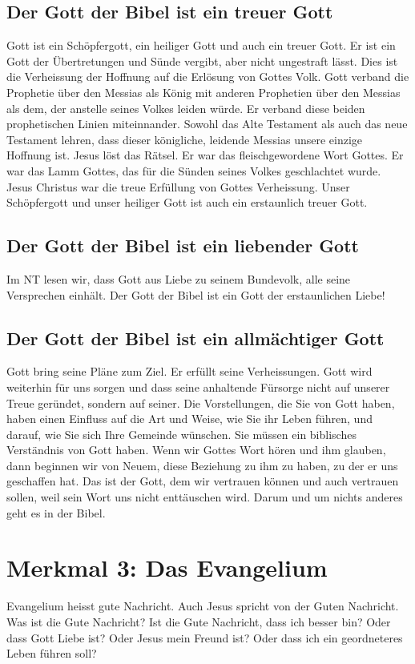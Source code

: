 \documentclass{../../inc/mybib}
\begin{document}
\subsection*{Der Gott der Bibel ist ein treuer Gott}
Gott ist ein Schöpfergott, ein heiliger Gott und auch ein treuer Gott. Er ist ein Gott der Übertretungen und Sünde vergibt, aber nicht ungestraft lässt. Dies ist die Verheissung der Hoffnung auf die Erlösung von Gottes Volk. Gott verband die Prophetie über den Messias als König mit anderen Prophetien über den Messias als dem, der anstelle seines Volkes leiden würde. Er verband diese beiden prophetischen Linien miteinnander. Sowohl das Alte Testament als auch das neue Testament lehren, dass dieser königliche, leidende Messias unsere einzige Hoffnung ist. Jesus löst das Rätsel. Er war das fleischgewordene Wort Gottes. Er war das Lamm Gottes, das für die Sünden seines Volkes geschlachtet wurde. Jesus Christus war die treue Erfüllung von Gottes Verheissung. Unser Schöpfergott und unser heiliger Gott ist auch ein erstaunlich treuer Gott.
\subsection*{Der Gott der Bibel ist ein liebender Gott}
Im NT lesen wir, dass Gott aus Liebe zu seinem Bundevolk, alle seine Versprechen einhält. Der Gott der Bibel ist ein Gott der erstaunlichen Liebe!
\subsection*{Der Gott der Bibel ist ein allmächtiger Gott}
Gott bring seine Pläne zum Ziel. Er erfüllt seine Verheissungen. Gott wird weiterhin für uns sorgen und dass seine anhaltende Fürsorge nicht auf unserer Treue geründet, sondern auf seiner. Die Vorstellungen, die Sie von Gott haben, haben einen Einfluss auf die Art und Weise, wie Sie ihr Leben führen, und darauf, wie Sie sich Ihre Gemeinde wünschen. Sie müssen ein biblisches Verständnis von Gott haben. Wenn wir Gottes Wort hören und ihm glauben, dann beginnen wir von Neuem, diese Beziehung zu ihm zu haben, zu der er uns geschaffen hat. Das ist der Gott, dem wir vertrauen können und auch vertrauen sollen, weil sein Wort uns nicht enttäuschen wird. Darum und um nichts anderes geht es in der Bibel.
\section*{Merkmal 3: Das Evangelium}
Evangelium heisst gute Nachricht. Auch Jesus spricht von der Guten Nachricht. Was ist die Gute Nachricht?  Ist die Gute Nachricht, dass ich besser bin? Oder dass Gott Liebe ist? Oder Jesus mein Freund ist? Oder dass ich ein geordneteres Leben führen soll?
\end{document}
